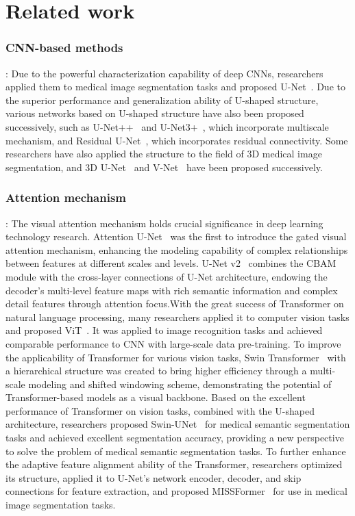 \section{Related work}

\subsubsection{CNN-based methods}:
Due to the powerful characterization capability of deep CNNs, researchers applied them to medical image segmentation tasks and proposed U-Net~\cite{ronneberger2015u}. Due to the superior performance and generalization ability of U-shaped structure, various networks based on U-shaped structure have also been proposed successively, such as U-Net++~\cite{zhou2019unet++} and U-Net3+~\cite{huang2020unet}, which incorporate multiscale mechanism, and Residual U-Net~\cite{baldeon2020adaresu,alom2018nuclei,mostafiz2018retinal,li2019automatic}, which incorporates residual connectivity. Some researchers have also applied the structure to the field of 3D medical image segmentation, and 3D U-Net~\cite{cciccek20163d} and V-Net~\cite{milletari2016v} have been proposed successively.

\subsubsection{Attention mechanism}:
The visual attention mechanism holds crucial significance in deep learning technology research. Attention U-Net~\cite{oktay2018attention} was the first to introduce the gated visual attention mechanism, enhancing the modeling capability of complex relationships between features at different scales and levels. U-Net v2~\cite{peng2023u} combines the CBAM module with the cross-layer connections of U-Net architecture, endowing the decoder's multi-level feature maps with rich semantic information and complex detail features through attention focus.With the great success of Transformer on natural language processing, many researchers applied it to computer vision tasks and proposed ViT~\cite{dosovitskiy2020image}. It was applied to image recognition tasks and achieved comparable performance to CNN with large-scale data pre-training. To improve the applicability of Transformer for various vision tasks, Swin Transformer~\cite{liu2021swin} with a hierarchical structure was created to bring higher efficiency through a multi-scale modeling and shifted windowing scheme, demonstrating the potential of Transformer-based models as a visual backbone. Based on the excellent performance of Transformer on vision tasks, combined with the U-shaped architecture, researchers proposed Swin-UNet~\cite{cao2022swin} for medical semantic segmentation tasks and achieved excellent segmentation accuracy, providing a new perspective to solve the problem of medical semantic segmentation tasks. To further enhance the adaptive feature alignment ability of the Transformer, researchers optimized its structure, applied it to U-Net's network encoder, decoder, and skip connections for feature extraction, and proposed MISSFormer~\cite{huang2022missformer} for use in medical image segmentation tasks.

